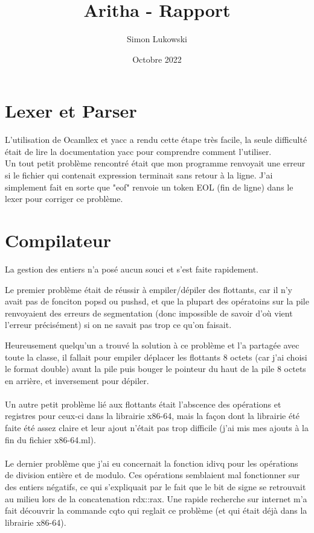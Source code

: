 \documentclass{article}
\title{Aritha - Rapport}
\author{Simon Lukowski}
\date{Octobre 2022}
\begin{document}
\maketitle

\section{Lexer et Parser}



L'utilisation de Ocamllex et yacc a rendu cette étape très facile, la seule difficulté était de lire la documentation yacc pour comprendre comment l'utiliser.
\\

Un tout petit problème rencontré était que mon programme renvoyait une erreur si le fichier qui contenait expression terminait sans retour à la ligne. J'ai simplement fait en sorte que "eof" renvoie un token EOL (fin de ligne) dans le lexer pour corriger ce problème.

\section {Compilateur}

La gestion des entiers n'a posé aucun souci et s'est faite rapidement.

Le premier problème était de réussir à empiler/dépiler des flottants, car il n'y avait pas de fonciton popsd ou pushsd, et que la plupart des opératoins sur la pile renvoyaient des erreurs de segmentation (donc impossible de savoir d'où vient l'erreur précisément) si on ne savait pas trop ce qu'on faisait.

Heureusement quelqu'un a trouvé la solution à ce problème et l'a partagée avec toute la classe, il fallait pour empiler déplacer les flottants 8 octets (car j'ai choisi le format double) avant la pile puis bouger le pointeur du haut de la pile 8 octets en arrière, et inversement pour dépiler.
\\
\\
Un autre petit problème lié aux flottants était l'abscence des opérations et registres pour ceux-ci dans la librairie x86-64, mais la façon dont la librairie été faite été assez claire et leur ajout n'était pas trop difficile (j'ai mis mes ajouts à la fin du fichier x86-64.ml).
\\
\\
Le dernier problème que j'ai eu concernait la fonction idivq pour les opérations de division entière et de modulo. Ces opérations semblaient mal fonctionner sur des entiers négatifs, ce qui s'expliquait par le fait que le bit de signe se retrouvait au milieu lors de la concatenation rdx::rax. Une rapide recherche sur internet m'a fait découvrir la commande cqto qui reglait ce problème (et qui était déjà dans la librairie x86-64). 
\end{document}

